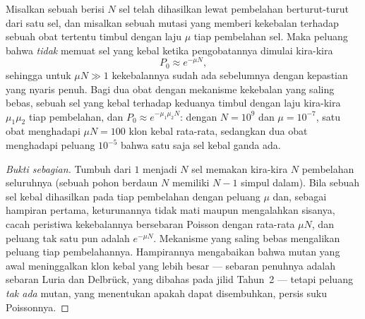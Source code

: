 \begin{theorem}\label{thm:b3:cancer-biology:goldie-coldman}
Misalkan sebuah  berisi $N$ sel telah dihasilkan lewat pembelahan
berturut-turut dari satu sel, dan misalkan sebuah mutasi yang memberi kekebalan
terhadap sebuah obat tertentu timbul dengan laju $\mu$ tiap pembelahan sel.
Maka peluang bahwa  \emph{tidak} memuat sel yang kebal ketika
pengobatannya dimulai kira-kira
\[
P_{0} \approx e^{-\mu N},
\]
sehingga untuk $\mu N \gg 1$ kekebalannya sudah ada sebelumnya dengan
kepastian yang nyaris penuh. Bagi dua obat dengan mekanisme kekebalan yang
saling bebas, sebuah sel yang kebal terhadap keduanya timbul dengan laju
kira-kira $\mu_{1}\mu_{2}$ tiap pembelahan, dan $P_{0}
\approx e^{-\mu_{1}\mu_{2}N}$: dengan $N = 10^{9}$ dan $\mu = 10^{-7}$,
satu obat menghadapi $\mu N = 100$ klon kebal rata-rata, sedangkan dua obat
menghadapi peluang $10^{-5}$ bahwa satu saja sel kebal ganda ada.
\end{theorem}
\begin{proof}[Bukti sebagian]
Tumbuh dari $1$ menjadi $N$ sel memakan kira-kira $N$ pembelahan seluruhnya
(sebuah pohon berdaun $N$ memiliki $N - 1$ simpul dalam). Bila sebuah sel
kebal dihasilkan pada tiap pembelahan dengan peluang $\mu$ dan, sebagai
hampiran pertama, keturunannya tidak mati maupun mengalahkan sisanya, cacah
peristiwa kekebalannya bersebaran Poisson dengan rata-rata $\mu N$, dan
peluang tak satu pun adalah $e^{-\mu N}$. Mekanisme yang saling bebas
mengalikan peluang tiap pembelahannya. Hampirannya mengabaikan bahwa mutan
yang awal meninggalkan klon kebal yang lebih besar --- sebaran penuhnya adalah
sebaran Luria dan Delbrück, yang dibahas pada jilid Tahun~2 --- tetapi
peluang \emph{tak ada} mutan, yang menentukan apakah  dapat
disembuhkan, persis suku Poissonnya.
\end{proof}


